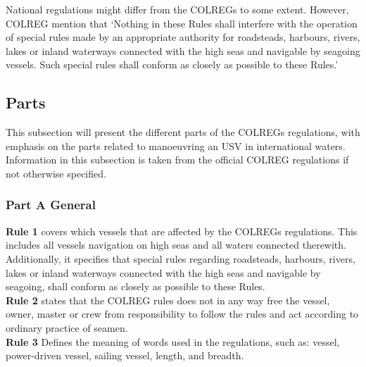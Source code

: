 National regulations might differ from the COLREGs to some extent. However, COLREG mention that ‘Nothing in these Rules shall interfere with the operation of special rules made by an appropriate authority for
roadsteads, harbours, rivers, lakes or inland waterways connected with the high seas and navigable by seagoing
vessels.
Such special rules shall conform as closely as possible to these Rules.’ \cite{colreg}

\subsection{Parts}
This subsection will present the different parts of the COLREGs regulations, with emphasis on the parts related to manoeuvring an USV in international waters. Information in this subsection is taken from the official COLREG regulations  \cite{colreg} if not otherwise specified.
\subsubsection{Part A General}
\textbf{Rule 1} covers which vessels that are affected by the COLREGs regulations. This includes all vessels navigation on high seas and all waters connected therewith.
Additionally, it specifies that special rules regarding roadsteads, harbours, rivers, lakes or inland waterways connected with the high seas and navigable by seagoing, shall conform as closely as possible to these Rules.
\\
\textbf{Rule 2} states that the COLREG rules does not in any way free the vessel, owner, master or crew from responsibility to follow the rules and act according to ordinary practice of seamen.
\\
\textbf{Rule 3} Defines the meaning of words used in the regulations, such as: vessel, power-driven vessel, sailing vessel, length, and breadth.

